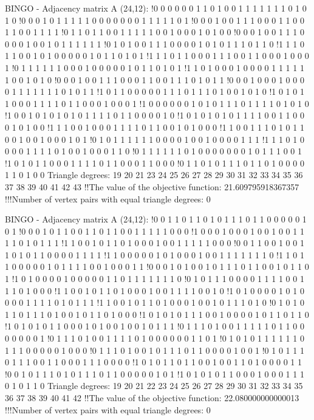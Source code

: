 BINGO - Adjacency matrix A (24,12):
!0 0 0 0 0 0 1 1 0 1 0 0 1 1 1 1 1 1 1 0 1 0 1 0
!0 0 0 1 0 1 1 1 1 1 0 0 0 0 0 0 0 1 1 1 1 1 0 1
!0 0 0 1 0 0 1 1 1 0 0 0 1 1 0 0 1 1 0 0 1 1 1 1
!0 1 1 0 1 1 0 0 1 1 1 1 1 0 0 1 0 0 0 1 0 1 0 0
!0 0 0 1 0 0 1 1 1 0 0 0 0 1 0 0 1 0 1 1 1 1 1 1
!0 1 0 1 0 0 1 1 1 0 0 0 0 1 0 1 0 1 1 1 0 1 1 0
!1 1 1 0 1 1 0 0 1 0 1 0 0 0 0 0 1 0 1 1 0 1 0 1
!1 1 1 0 1 1 0 0 0 1 1 1 0 0 1 1 0 0 0 1 0 0 0 1
!0 1 1 1 1 1 1 0 0 0 1 0 0 0 0 0 1 0 1 1 0 1 0 1
!1 1 0 1 0 0 0 1 0 0 0 0 1 1 1 1 1 1 0 0 1 0 1 0
!0 0 0 1 0 0 1 1 1 0 0 0 1 1 0 0 1 1 1 0 1 0 1 1
!0 0 0 1 0 0 0 1 0 0 0 0 1 1 1 1 1 1 1 0 1 0 1 1
!1 0 1 1 0 0 0 0 0 1 1 1 0 1 1 1 0 1 0 0 1 0 1 0
!1 0 1 0 1 1 0 0 0 1 1 1 1 0 1 1 0 0 0 1 0 0 0 1
!1 0 0 0 0 0 0 1 0 1 0 1 1 1 0 1 1 1 1 0 1 0 1 0
!1 0 0 1 0 1 0 1 0 1 0 1 1 1 1 0 1 1 0 0 0 0 1 0
!1 0 1 0 1 0 1 0 1 1 1 1 0 0 1 1 0 0 0 1 0 1 0 0
!1 1 1 0 0 1 0 0 0 1 1 1 1 0 1 1 0 0 1 0 1 0 0 0
!1 1 0 0 1 1 1 0 1 0 1 1 0 0 1 0 0 1 0 0 0 1 0 1
!0 1 0 1 1 1 1 1 1 0 0 0 0 1 0 0 1 0 0 0 0 1 1 1
!1 1 1 0 1 0 0 0 0 1 1 1 1 0 1 0 0 1 0 0 0 1 1 0
!0 1 1 1 1 1 1 0 1 0 0 0 0 0 0 0 1 0 1 1 1 0 0 1
!1 0 1 0 1 1 0 0 0 1 1 1 1 0 1 1 0 0 0 1 1 0 0 0
!0 1 1 0 1 0 1 1 1 0 1 1 0 1 0 0 0 0 1 1 0 1 0 0
Triangle degrees:
19 20 21 23 24 25 26 27 28 29 30 31 32 33 34 35 36 37 38 39 40 41 42 43
!!The value of the objective function: 21.609795918367357
!!!Number of vertex pairs with equal triangle degrees: 0


BINGO - Adjacency matrix A (24,12):
!0 0 1 1 0 1 1 0 1 0 1 1 1 0 1 1 0 0 0 0 0 1 0 1 
!0 0 0 1 0 1 1 0 0 1 1 0 1 1 0 0 1 1 1 1 1 0 0 0 
!1 0 0 0 1 0 0 0 1 0 0 1 0 0 1 1 1 1 0 1 0 1 1 1 
!1 1 0 0 1 0 1 1 0 1 0 0 0 1 0 0 1 1 1 1 1 0 0 0 
!0 0 1 1 0 0 1 0 0 1 1 0 1 0 1 1 0 0 0 0 1 1 1 1 
!1 1 0 0 0 0 0 1 0 1 0 0 0 1 0 0 1 1 1 1 1 1 1 0 
!1 1 0 1 1 0 0 0 0 0 1 0 1 1 1 1 0 0 1 0 0 0 1 1 
!0 0 0 1 0 1 0 0 1 0 1 1 1 0 1 1 0 0 1 0 1 1 0 1 
!1 0 1 0 0 0 0 1 0 0 0 0 0 1 1 0 1 1 1 1 1 1 1 0 
!0 1 0 1 1 1 0 0 0 0 1 1 1 1 0 0 1 1 1 0 1 0 0 0 
!1 1 0 0 1 0 1 1 0 1 0 0 0 1 0 0 1 1 1 1 0 0 1 0 
!1 0 1 0 0 0 0 1 0 1 0 0 0 0 1 1 1 1 0 1 0 1 1 1 
!1 1 0 0 1 0 1 1 0 1 0 0 0 1 0 0 1 0 1 1 1 0 1 0 
!0 1 0 1 0 1 1 0 1 1 1 0 1 0 0 1 0 1 1 0 1 0 0 0 
!1 0 1 0 1 0 1 1 1 0 0 1 0 0 0 0 1 0 1 1 0 1 1 0 
!1 0 1 0 1 0 1 1 0 0 0 1 0 1 0 0 1 0 0 1 0 1 1 1 
!0 1 1 1 0 1 0 0 1 1 1 1 1 0 1 1 0 0 0 0 0 0 0 1 
!0 1 1 1 0 1 0 0 1 1 1 1 0 1 0 0 0 0 0 0 1 1 0 1 
!0 1 0 1 0 1 1 1 1 1 1 0 1 1 1 0 0 0 0 0 1 0 0 0 
!0 1 1 1 0 1 0 0 1 0 1 1 1 0 1 1 0 0 0 0 1 0 0 1 
!0 1 0 1 1 1 0 1 1 1 0 0 1 1 0 0 0 1 1 1 0 0 0 0 
!1 0 1 0 1 1 0 1 1 0 0 1 0 0 1 1 0 1 0 0 0 0 1 1 
!0 0 1 0 1 1 1 0 1 0 1 1 1 0 1 1 0 0 0 0 0 1 0 1 
!1 0 1 0 1 0 1 1 0 0 0 1 0 0 0 1 1 1 0 1 0 1 1 0 
Triangle degrees:
19 20 21 22 23 24 25 26 27 28 29 30 31 32 33 34 35 36 37 38 39 40 41 42 
!!The value of the objective function: 22.080000000000013
!!!Number of vertex pairs with equal triangle degrees: 0


